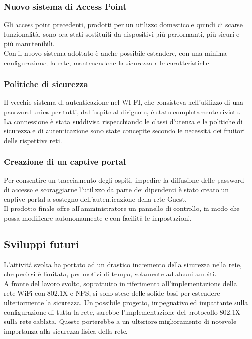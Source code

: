 \documentclass[Tesi.tex]{subfiles}
\begin{document}
\subsubsection{Nuovo sistema di Access Point}
Gli access point precedenti, prodotti per un utilizzo domestico e quindi di scarse funzionalità, sono ora stati sostituiti da dispositivi più performanti, più sicuri e più manutenibili. \\
Con il nuovo sistema adottato è anche possibile estendere, con una minima configurazione, la rete, mantenendone la sicurezza e le caratteristiche.

\subsubsection{Politiche di sicurezza}
Il vecchio sistema di autenticazione nel WI-FI, che consisteva nell'utilizzo di una password unica per tutti, dall'ospite al dirigente, è stato completamente rivisto. \\
La connessione è stata suddivisa rispecchiando le classi d'utenza e le politiche di sicurezza e di autenticazione sono state concepite secondo le necessità dei fruitori delle rispettive reti.

\subsubsection{Creazione di un captive portal}
Per consentire un tracciamento degli ospiti, impedire la diffusione delle password di accesso e scoraggiarne l'utilizzo da parte dei dipendenti è stato creato un captive portal a sostegno dell'autenticazione della rete Guest. \\ 
Il prodotto finale offre all'amministratore un pannello di controllo, in modo che possa modificare autonomamente e con facilità le impostazioni.


\newpage
\subsection{Sviluppi futuri}
L'attività svolta ha portato ad un drastico incremento della sicurezza nella rete, che però si è limitata, per motivi di tempo, solamente ad alcuni ambiti.\\
A fronte del lavoro svolto, soprattutto in riferimento all'implementazione della rete WiFi con 802.1X e NPS, si sono stese delle solide basi per estendere ulteriormente la sicurezza. Un possibile progetto, impegnativo ed impattante sulla configurazione di tutta la rete, sarebbe l'implementazione del protocollo 802.1X sulla rete cablata. Questo porterebbe a un ulteriore miglioramento di notevole importanza alla sicurezza fisica della rete.
\end{document}
